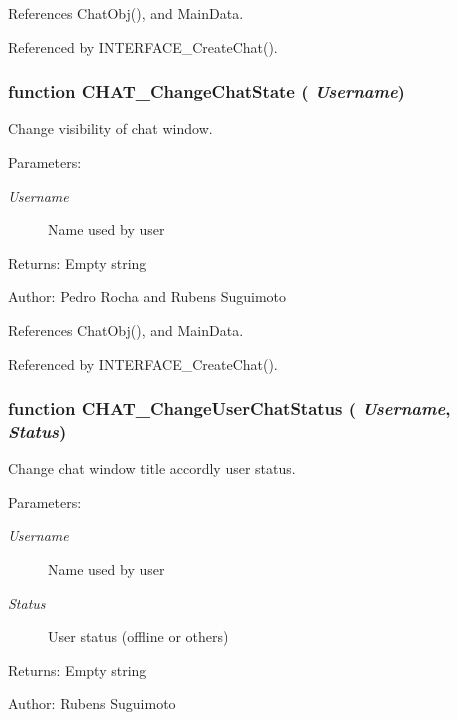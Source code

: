 References ChatObj(), and MainData.

Referenced by INTERFACE\_\-CreateChat().
\subsubsection[CHAT\_\-ChangeChatState]{\setlength{\rightskip}{0pt plus 5cm}function CHAT\_\-ChangeChatState ( {\em Username})}\label{chat_2chat_8js_029777c2341fa8d98c97500837a9b69b}


Change visibility of chat window. 

\begin{Desc}
\item[Parameters:]
\begin{description}
\item[{\em Username}]Name used by user \end{description}
\end{Desc}
\begin{Desc}
\item[Returns:]Empty string \end{Desc}
\begin{Desc}
\item[Author:]Pedro Rocha and Rubens Suguimoto \end{Desc}


References ChatObj(), and MainData.

Referenced by INTERFACE\_\-CreateChat().
\subsubsection[CHAT\_\-ChangeUserChatStatus]{\setlength{\rightskip}{0pt plus 5cm}function CHAT\_\-ChangeUserChatStatus ( {\em Username}, \/   {\em Status})}\label{chat_2chat_8js_981a79b00b69194a04363d526da3d758}


Change chat window title accordly user status. 

\begin{Desc}
\item[Parameters:]
\begin{description}
\item[{\em Username}]Name used by user \item[{\em Status}]User status (offline or others) \end{description}
\end{Desc}
\begin{Desc}
\item[Returns:]Empty string \end{Desc}
\begin{Desc}
\item[Author:]Rubens Suguimoto \end{Desc}


